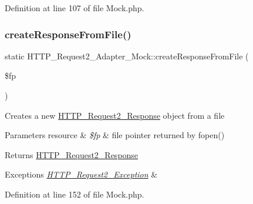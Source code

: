 Definition at line 107 of file Mock.\+php.

\hypertarget{classHTTP__Request2__Adapter__Mock_ae767247efbe46fa5f1d5bf4363c2eb52}{}\label{classHTTP__Request2__Adapter__Mock_ae767247efbe46fa5f1d5bf4363c2eb52} 
\subsubsection{\texorpdfstring{create\+Response\+From\+File()}{createResponseFromFile()}}
{\footnotesize\ttfamily static H\+T\+T\+P\+\_\+\+Request2\+\_\+\+Adapter\+\_\+\+Mock\+::create\+Response\+From\+File (\begin{DoxyParamCaption}\item[{}]{\$fp }\end{DoxyParamCaption})\hspace{0.3cm}{\ttfamily [static]}}

Creates a new \hyperlink{classHTTP__Request2__Response}{H\+T\+T\+P\+\_\+\+Request2\+\_\+\+Response} object from a file


\begin{DoxyParams}[1]{Parameters}
resource & {\em \$fp} & file pointer returned by fopen()\\
\hline
\end{DoxyParams}
\begin{DoxyReturn}{Returns}
\hyperlink{classHTTP__Request2__Response}{H\+T\+T\+P\+\_\+\+Request2\+\_\+\+Response} 
\end{DoxyReturn}

\begin{DoxyExceptions}{Exceptions}
{\em \hyperlink{classHTTP__Request2__Exception}{H\+T\+T\+P\+\_\+\+Request2\+\_\+\+Exception}} & \\
\hline
\end{DoxyExceptions}


Definition at line 152 of file Mock.\+php.

\hypertarget{classHTTP__Request2__Adapter__Mock_a0732ba355bbab5c382378be5169084f0}{}\label{classHTTP__Request2__Adapter__Mock_a0732ba355bbab5c382378be5169084f0} 
